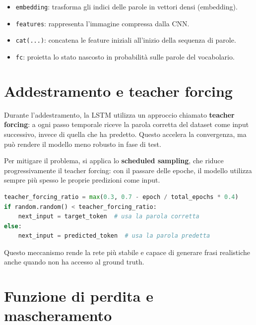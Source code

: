 \documentclass[11pt,a4paper]{report}
\begin{document}
\begin{tcolorbox}[title=Spiegazione passo-passo]
\begin{itemize}
  \item \texttt{embedding}: trasforma gli indici delle parole in vettori densi (embedding).
  \item \texttt{features}: rappresenta l’immagine compressa dalla CNN.
  \item \texttt{cat(...)}: concatena le feature iniziali all’inizio della sequenza di parole.
  \item \texttt{fc}: proietta lo stato nascosto in probabilità sulle parole del vocabolario.
\end{itemize}
\end{tcolorbox}

\section{Addestramento e teacher forcing}

Durante l’addestramento, la LSTM utilizza un approccio chiamato \textbf{teacher forcing}: a ogni passo temporale riceve la parola corretta del dataset come input successivo, invece di quella che ha predetto.  
Questo accelera la convergenza, ma può rendere il modello meno robusto in fase di test.

Per mitigare il problema, si applica lo \textbf{scheduled sampling}, che riduce progressivamente il teacher forcing: con il passare delle epoche, il modello utilizza sempre più spesso le proprie predizioni come input.

\begin{lstlisting}[language=Python, caption={Scheduled sampling nel training loop.}]
teacher_forcing_ratio = max(0.3, 0.7 - epoch / total_epochs * 0.4)
if random.random() < teacher_forcing_ratio:
    next_input = target_token  # usa la parola corretta
else:
    next_input = predicted_token  # usa la parola predetta
\end{lstlisting}

\begin{tcolorbox}[title=Nota]
Questo meccanismo rende la rete più stabile e capace di generare frasi realistiche anche quando non ha accesso al ground truth.
\end{tcolorbox}

\section{Funzione di perdita e mascheramento}
\end{document}
